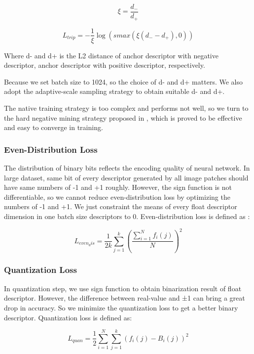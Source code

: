 \documentclass{svproc}
\begin{document}
\begin{equation}
\xi  = \frac{d _{-}}{d _{+}}
\end{equation}

\begin{equation}
L_{trip}  = - \frac{1}{\xi}\log (smax(\xi( d _{-} - d _{+}  ) , 0)) 
\end{equation}

Where d- and d+ is the L2 distance of anchor descriptor with negative descriptor, anchor descriptor with positive descriptor, respectively. 

Because we set batch size to 1024, so the choice of d- and d+ matters. We also adopt the adaptive-scale sampling strategy to obtain suitable d- and d+.

The native training strategy is too complex and performs not well, so we turn to the hard negative mining strategy proposed in \cite{c15}, which is proved to be effective and easy to converge in training. 

\subsubsection{Even-Distribution Loss} 
The distribution of binary bits reflects the encoding quality of neural network. In large dataset, same bit of every descriptor generated by all image patches should have same numbers of -1 and +1 roughly. However, the sign function is not differentiable, so we cannot reduce even-distribution loss by optimizing the numbers of -1 and +1. We just constraint the means of every float descriptor dimension in one batch size descriptors to 0. Even-distribution loss is defined as :

\begin{equation}
L_{even_dis}  =  \frac{1}{2k}\sum\limits_{j=1}^{k}\left(\frac{\sum\limits_{i=1}^{N}f_i(j)}{N}\right )^2
\end{equation}


\subsubsection{Quantization Loss} 
In quantization step, we use sign function to obtain binarization result of float descriptor. However, the difference between real-value and ±1 can bring a great drop in accuracy. So we minimize the quantization loss to get a better binary descriptor. Quantization loss is defined as:

\begin{equation}
L_{quan}  =  \frac{1}{2}\sum\limits_{i=1}^{N} \sum\limits_{j=1}^{k} \left(f_i(j)-B_i(j) \right )^2
\end{equation}
\end{document}
